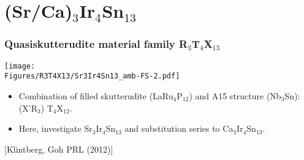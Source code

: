 \section{(Sr/Ca)$_3$Ir$_4$Sn$_{13}$}


\begin{frame}[label=CIS-1]
\frametitle{Quasiskutterudite material family R$_3$T$_4$X$_{13}$}

\centerline{\texttt{[image: \\Figures/R3T4X13/Sr3Ir4Sn13\_amb-FS-2.pdf]}}
\begin{itemize}
\item
Combination of filled skutterudite (LaRu$_4$P$_{12}$) and A15 structure (Nb$_3$Sn): (X'R$_3$) T$_4$X$_{12}$. 

\item
Here, investigate Sr$_3$Ir$_4$Sn$_{13}$ and substitution series to  Ca$_3$Ir$_4$Sn$_{13}$.

\end{itemize}
{\small \centerline{[Klintberg, Goh PRL (2012)]}}

\end{frame}


